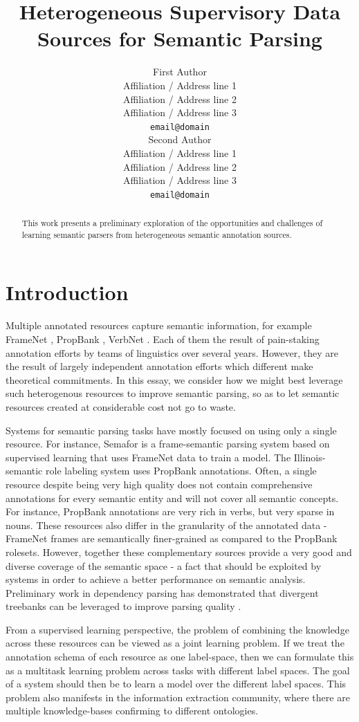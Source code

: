 \documentclass[11pt]{article}
\title{Heterogeneous Supervisory Data Sources for Semantic Parsing}
\author{First Author \\
  Affiliation / Address line 1 \\
  Affiliation / Address line 2 \\
  Affiliation / Address line 3 \\
  {\tt email@domain} \\\And
  Second Author \\
  Affiliation / Address line 1 \\
  Affiliation / Address line 2 \\
  Affiliation / Address line 3 \\
  {\tt email@domain} \\}
\date{}
\begin{document}
\maketitle
\begin{abstract}
This work presents a preliminary exploration of the opportunities and challenges of learning semantic parsers from heterogeneous semantic annotation sources.
\end{abstract}

\section{Introduction}
Multiple annotated resources capture semantic information, for example FrameNet \cite{framenet}, PropBank \cite{propbank}, VerbNet \cite{vnet}. Each of them the result of pain-staking annotation efforts by teams of linguistics over several years. However, they are the result of largely independent annotation efforts which different make theoretical commitments. In this essay, we consider how we might best leverage such heterogenous resources to improve semantic parsing, so as to let semantic resources created at considerable cost not go to waste.

Systems for semantic parsing tasks have mostly focused on using only a single resource. For instance, Semafor \cite{semafor} is a frame-semantic parsing system based on supervised learning that uses FrameNet data to train a model. The Illinois-semantic role labeling system \cite{illinoisSRL} uses PropBank annotations. Often, a single resource despite being very high quality does not contain comprehensive annotations for every semantic entity and will not cover all semantic concepts. For instance, PropBank annotations are very rich in verbs, but very sparse in nouns. These resources also differ in the granularity of the annotated data - FrameNet frames are semantically finer-grained as compared to the PropBank rolesets. However, together these complementary sources provide a very good and diverse coverage of the semantic space - a fact that should be exploited by systems in order to achieve a better performance on semantic analysis. Preliminary work in dependency parsing has demonstrated that divergent treebanks can be leveraged to improve parsing quality \cite{zhou:2013}.

From a supervised learning perspective, the problem of combining the knowledge across these resources can be viewed as a joint learning problem. If we treat the annotation schema of each resource as one label-space, then we can formulate this as a multitask learning problem across tasks with different label spaces. The goal of a system should then be to learn a model over the different label spaces. This problem also manifests in the information extraction community, where there are multiple knowledge-bases confirming to different ontologies.  
\end{document}
